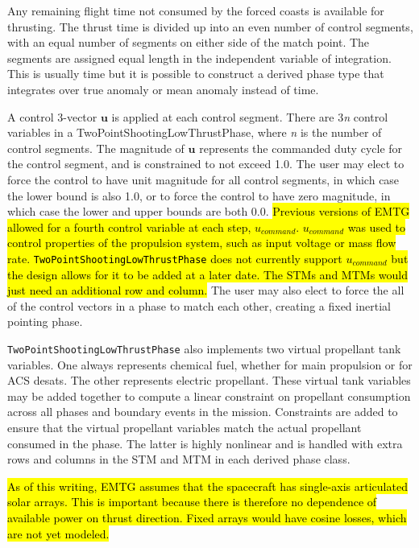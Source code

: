 Any remaining flight time not consumed by the forced coasts is available for thrusting. The thrust time is divided up into an even number of control segments, with an equal number of segments on either side of the match point. The segments are assigned equal length in the independent variable of integration. This is usually time but it is possible to construct a derived phase type that integrates over true anomaly or mean anomaly instead of time.

A control 3-vector $\mathbf{u}$ is applied at each control segment. There are 3\textit{n} control variables in a TwoPointShootingLowThrustPhase, where \textit{n} is the number of control segments. The magnitude of $\mathbf{u}$ represents the commanded duty cycle for the control segment, and is constrained to not exceed 1.0. The user may elect to force the control to have unit magnitude for all control segments, in which case the lower bound is also 1.0, or to force the control to have zero magnitude, in which case the lower and upper bounds are both 0.0. \hl{Previous versions of EMTG allowed for a fourth control variable at each step, $u_{command}$. $u_{command}$ was used to control properties of the propulsion system, such as input voltage or mass flow rate. \texttt{TwoPointShootingLowThrustPhase} does not currently support $u_{command}$ but the design allows for it to be added at a later date. The STMs and MTMs would just need an additional row and column.} The user may also elect to force the all of the control vectors in a phase to match each other, creating a fixed inertial pointing phase.

\texttt{TwoPointShootingLowThrustPhase} also implements two virtual propellant tank variables. One always represents chemical fuel, whether for main propulsion or for \ac{ACS} desats. The other represents electric propellant. These virtual tank variables may be added together to compute a linear constraint on propellant consumption across all phases and boundary events in the mission. Constraints are added to ensure that the virtual propellant variables match the actual propellant consumed in the phase. The latter is highly nonlinear and is handled with extra rows and columns in the \ac{STM} and \ac{MTM} in each derived phase class.

\hl{As of this writing, EMTG assumes that the spacecraft has single-axis articulated solar arrays. This is important because there is therefore no dependence of available power on thrust direction. Fixed arrays would have cosine losses, which are not yet modeled.}

